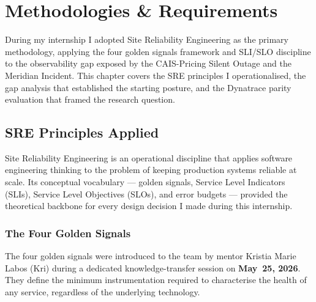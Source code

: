 
\chapter{Methodologies \& Requirements}
\label{chap:methodologies}

During my internship I adopted Site Reliability Engineering as the primary
methodology, applying the four golden signals framework and SLI/SLO discipline
to the observability gap exposed by the CAIS-Pricing Silent Outage and the
Meridian Incident. This chapter covers the SRE principles I operationalised,
the gap analysis that established the starting posture, and the Dynatrace
parity evaluation that framed the research question.

\section{SRE Principles Applied}
\label{sec:sre_principles}

Site Reliability Engineering is an operational discipline that applies
software engineering thinking to the problem of keeping production
systems reliable at scale. Its conceptual vocabulary --- golden signals,
Service Level Indicators (SLIs), Service Level Objectives (SLOs), and
error budgets --- provided the theoretical backbone for every design
decision I made during this internship.

\subsection{The Four Golden Signals}

The four golden signals were introduced to the team by mentor Kristia
Marie Labos (Kri) during a dedicated knowledge-transfer session on
\textbf{May~25, 2026}. They define the minimum instrumentation required
to characterise the health of any service, regardless of the underlying
technology.

